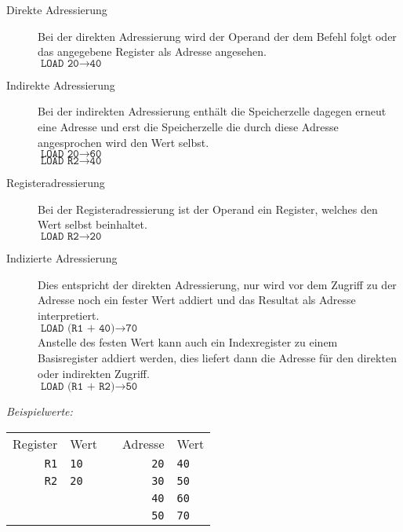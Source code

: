 \documentclass
[
	8pt,		%
	ngerman,	%
	a4paper,	%
	landscape,	%
	final		%
]{extarticle}
\begin{document}
\begin{multicols*}{4}
\begin{description}
	\item[Direkte Adressierung]
	      Bei der direkten Adressierung wird der Operand der dem Befehl
	      folgt oder das angegebene Register als Adresse angesehen. \\
	      $\texttt{LOAD 20}\rightarrow\texttt{40}$

	\item[Indirekte Adressierung]
	      Bei der indirekten Adressierung enthält die Speicherzelle dagegen
	      erneut eine Adresse und erst die Speicherzelle die durch diese
	      Adresse angesprochen wird den Wert selbst. \\
	      $\texttt{LOAD 20}\rightarrow\texttt{60}$ \\
	      $\texttt{LOAD R2}\rightarrow\texttt{40}$

	\item[Registeradressierung]
	      Bei der Registeradressierung ist der Operand ein Register, welches
	      den Wert selbst beinhaltet. \\
	      $\texttt{LOAD R2}\rightarrow\texttt{20}$

	\item[Indizierte Adressierung]
	      Dies entspricht der direkten Adressierung, nur wird vor dem
	      Zugriff zu der Adresse noch ein fester Wert addiert und das
	      Resultat als Adresse interpretiert. \\
	      $\texttt{LOAD (R1 + 40)}\rightarrow\texttt{70}$ \\
	      Anstelle des festen Wert kann auch ein Indexregister zu einem
	      Basisregister addiert werden, dies liefert dann die Adresse für
	      den direkten oder indirekten Zugriff. \\
	      $\texttt{LOAD (R1 + R2)}\rightarrow\texttt{50}$
\end{description}
\emph{Beispielwerte:}
\begin{center}
	\begin{tabular}{|r|l|c|r|l|}\cline{1-2}\cline{4-5}
		Register    & Wert        &  & Adresse     & Wert        \\\cline{1-2}\cline{4-5}
		\texttt{R1} & \texttt{10} &  & \texttt{20} & \texttt{40} \\\cline{1-2}\cline{4-5}
		\texttt{R2} & \texttt{20} &  & \texttt{30} & \texttt{50} \\\cline{1-2}\cline{4-5}
		            &             &  & \texttt{40} & \texttt{60} \\\cline{1-2}\cline{4-5}
		            &             &  & \texttt{50} & \texttt{70} \\\cline{1-2}\cline{4-5}
	\end{tabular}
\end{center}



\end{multicols*}
\end{document}
